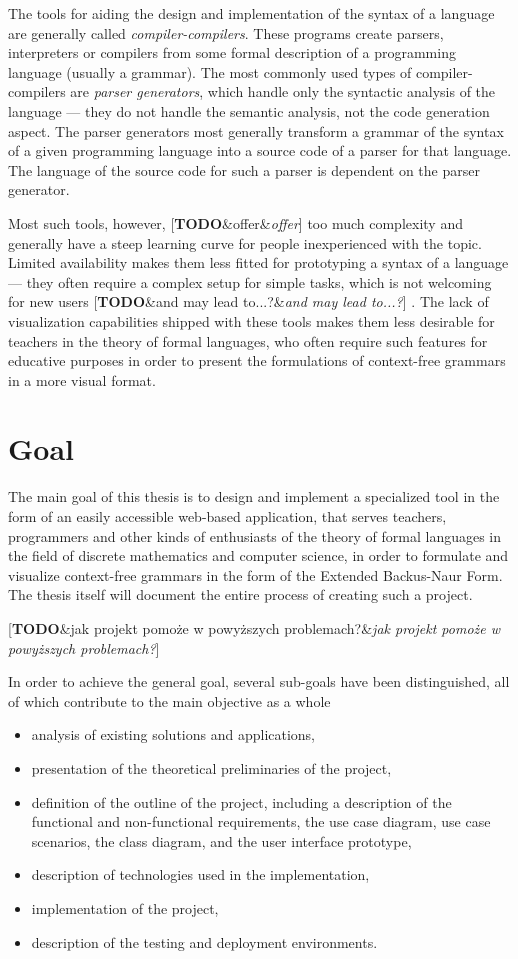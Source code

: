 \documentclass[english,engineering]{wizthesis}
\newcommand{\todo}[1]{%
  {\color{red}[\textbf{TODO}\ifx&#1&{}\else{ }\fi\textit{#1}]}%
}
\begin{document}
The tools for aiding the design and implementation of the syntax of a language
are generally called \textit{compiler-compilers}. These programs create parsers,
interpreters or compilers from some formal description of a programming
language (usually a grammar). The most commonly used types of
compiler-compilers are \textit{parser generators}, which handle only the
syntactic analysis of the language --- they do not handle the semantic analysis,
not the code generation aspect. The parser generators most generally transform a
grammar of the syntax of a given programming language into a source code of a
parser for that language. The language of the source code for such a parser is
dependent on the parser generator.

Most such tools, however, \todo{offer} too much complexity and generally have a steep
learning curve for people inexperienced with the topic. Limited availability
makes them less fitted for prototyping a syntax of a language --- they often
require a complex setup for simple tasks, which is not welcoming for new users
\todo{and may lead to...?}. The lack of visualization capabilities shipped with
these tools makes them less desirable for teachers in the theory of formal
languages, who often require such features for educative purposes in order to
present the formulations of context-free grammars in a more visual format.

\section{Goal}

The main goal of this thesis is to design and implement a specialized tool in
the form of an easily accessible web-based application, that serves teachers,
programmers and other kinds of enthusiasts of the theory of formal languages in
the field of discrete mathematics and computer science, in order to formulate
and visualize context-free grammars in the form of the Extended Backus-Naur
Form. The thesis itself will document the entire process of creating such a
project.

\todo{jak projekt pomoże w powyższych problemach?}

In order to achieve the general goal, several sub-goals have been
distinguished, all of which contribute to the main objective as a whole
\begin{itemize}
  \item analysis of existing solutions and applications,
  \item presentation of the theoretical preliminaries of the project,
  \item definition of the outline of the project, including a description of
  the functional and non-functional requirements, the use case diagram, use case
  scenarios, the class diagram, and the user interface prototype,
  \item description of technologies used in the implementation,
  \item implementation of the project,
  \item description of the testing and deployment environments.
\end{itemize}
\end{document}
